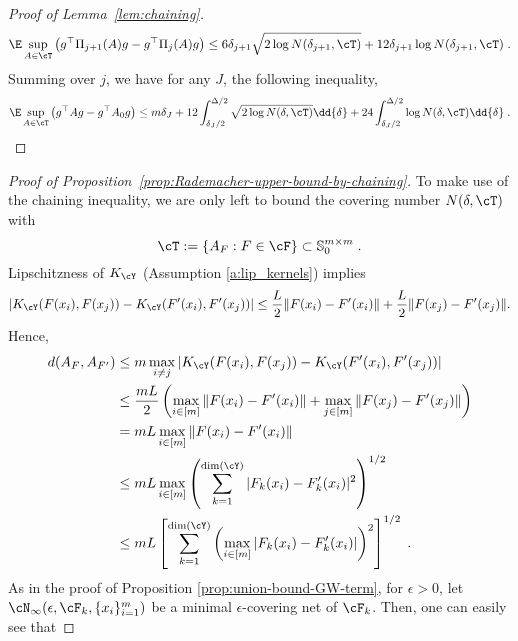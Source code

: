 \documentclass[11pt]{article}
\begin{document}
\begin{proof}[Proof of Lemma~\ref{lem:chaining}]
	\begin{align*}
		\E \sup_{A \in \cT}  \left( g^\top \Pi_{j+1}(A) g -  g^\top \Pi_{j}(A) g \right) \leq 6\delta_{j+1} \sqrt{2\log N(\delta_{j+1}, \cT)} + 12 \delta_{j+1} \log N(\delta_{j+1}, \cT) \;.
	\end{align*}
	Summing over $j$, we have for any $J$, the following inequality,
	\begin{align*}
		\E \sup_{A \in \cT} \left( g^\top A g  - g^\top A_0 g  \right) 
		\leq m \delta_J +  12\int_{\delta_J / 2}^{\Delta/2} \sqrt{2 \log N(\delta, \cT)} \dd{\delta} + 24 \int_{\delta_J / 2}^{\Delta/2} \log N(\delta, \cT) \dd{\delta} \;.
	\end{align*}
\end{proof}


\begin{proof}[Proof of Proposition~\ref{prop:Rademacher-upper-bound-by-chaining}]
	To make use of the chaining inequality, we are only left to bound the covering number $N(\delta, \cT)$ with
	\begin{equation*}
		\cT := \{ A_F : F \in \cF \} \subset \mathbb{S}_0^{m \times m}\;.
	\end{equation*}
	Lipschitzness of $K_{\cY}$ (Assumption \ref{a:lip_kernels}) implies 
	\begin{equation*}
		\left|K_{\cY}(F(x_i), F(x_j)) - K_{\cY}(F'(x_i), F'(x_j))\right| \le \frac{L}{2} \|F(x_i) - F'(x_i)\| + \frac{L}{2} \|F(x_j) - F'(x_j)\|.
	\end{equation*}
	Hence, 
	\begin{equation*}
		\begin{split}
			d(A_F, A_{F'})
			& \leq m \max_{i\neq j} \left|K_{\cY}(F(x_i), F(x_j)) - K_{\cY}(F'(x_i), F'(x_j))\right| \\
			& \le \frac{m L}{2} \left( \max_{i \in [m]} \|F(x_i) - F'(x_i)\| + \max_{j \in [m]} \|F(x_j) - F'(x_j)\| \right)\\
			& = m L \max_{i \in [m]} \| F(x_i) - F'(x_i) \| \\
			& \le m L \max_{i \in [m]} \left(\sum_{k = 1}^{\mathrm{dim}(\cY)}  |F_k(x_i) - F_k'(x_i)|^2 \right)^{1/2} \\
			& \le m L \left[\sum_{k = 1}^{\mathrm{dim}(\cY)} \left(\max_{i \in [m]} |F_k(x_i) - F_k'(x_i)|\right)^2 \right]^{1/2} \;.	
		\end{split}
	\end{equation*}
	As in the proof of Proposition \ref{prop:union-bound-GW-term}, for $\epsilon > 0$, let $\cN_\infty(\epsilon, \cF_k, \{x_i\}_{i=1}^{m})$ be a minimal $\epsilon$-covering net of $\cF_k$. Then, one can easily see that 

\end{proof}
\end{document}
